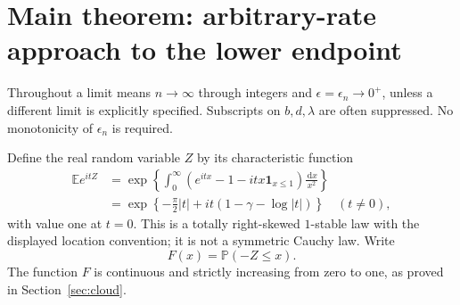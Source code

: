 \documentclass[11pt,a4paper]{article}
\numberwithin{equation}{section}
\theoremstyle{definition}
\theoremstyle{remark}
\newcommand{\E}{\mathbb E}
\newcommand{\Prob}{\mathbb P}
\newcommand{\ee}{\epsilon}
\newcommand{\dd}{\,\mathrm d}
\newcommand{\ind}{\mathbf1}
\begin{document}
\section{Main theorem: arbitrary-rate approach to the lower endpoint}
\label{sec:main}
Throughout a limit means $n\to\infty$ through integers and
$\ee=\ee_n\to0^+$, unless a different limit is explicitly specified.
Subscripts on $b,d,\lambda$ are often suppressed. No monotonicity of
$\ee_n$ is required.

Define the real random variable $Z$ by its characteristic function
\begin{align}
 \E e^{itZ}
 &=\exp\left\{\int_0^\infty
       (e^{itx}-1-itx\ind_{x\le1})\frac{\dd x}{x^2}\right\}\label{eq:stablecf}\\
 &=\exp\left\{-\frac\pi2|t|+it(1-\gamma-\log|t|)\right\}
 \quad(t\ne0),\nonumber
\end{align}
with value one at $t=0$. This is a totally right-skewed $1$-stable law
with the displayed location convention; it is not a symmetric Cauchy
law. Write
\begin{equation}\label{eq:F}
 F(x)=\Prob(-Z\le x).
\end{equation}
The function $F$ is continuous and strictly increasing from zero to one,
as proved in Section~\ref{sec:cloud}.
\end{document}
